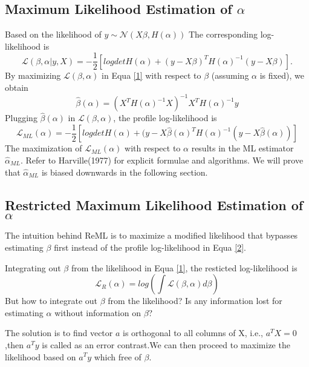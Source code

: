 \documentclass[12pt]{article}
\begin{document}
\subsection{Maximum Likelihood Estimation of $\alpha$}
Based on the likelihood of  $y \sim \mathcal{N}(X\beta,H(\alpha))$
The corresponding log-likelihood is
\begin{equation}\label{1}
\mathcal{L}(\beta,\alpha|y,X) = - \frac{1}{2}[log det H(\alpha) + (y - X\beta)^TH(\alpha)^{-1}(y - X\beta)].
\end{equation}
By maximizing $\mathcal{L}(\beta,\alpha)$ in Equa \ref{1} with respect to $\beta$ (assuming $\alpha$ is fixed), we obtain
\begin{equation}
\hat \beta (\alpha) = (X^TH(\alpha)^{-1}X)^{-1}X^TH(\alpha)^{-1}y
\end{equation}
Plugging $\widehat \beta (\alpha)$ in $\mathcal{L}(\beta,\alpha)$, the profile log-likelihood is
\begin{equation}\label{2}
\mathcal{L}_{ML}(\alpha) = -\frac{1}{2}[log det H(\alpha) + (y-X\hat\beta(\alpha)^TH(\alpha)^{-1}(y - X\hat\beta(\alpha))]
\end{equation}
The maximization of $\mathcal{L}_{ML}(\alpha)$  with respect to $\alpha$ results in the ML estimator $\widehat\alpha_{ML}$.
Refer to Harville(1977) for explicit formulae and algorithms.
We will prove that $\widehat\alpha_{ML}$ is biased downwards in the following section.

\subsection{Restricted Maximum Likelihood Estimation of $\alpha$}
The intuition behind ReML \cite{[Patterson and Thompson,
1971] [Harville, 1974]} is to maximize a modified likelihood that bypasses estimating $\beta$ first instead of the profile log-likelihood in Equa \ref{2}.

Integrating out $\beta$ from the likelihood in Equa \ref{1}, the resticted log-likelihood is
\begin{equation}
\mathcal{L}_R(\alpha) = log(\int \mathcal{L}(\beta,\alpha)d\beta)
\end{equation}
But how to integrate out $\beta$ from the likelihood? Is any information lost for estimating $\alpha$ without information on $\beta$?

The solution is to find vector $a$ is orthogonal to all columns of X, i.e., $a^T X = 0 $,then $a^T y$ is called as an error contrast.We can then proceed to maximize the likelihood based on $a^T y$ which free of $\beta$. 
\end{document}
